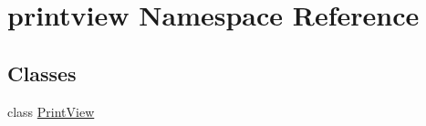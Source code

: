 \hypertarget{namespaceprintview}{}\section{printview Namespace Reference}
\label{namespaceprintview}
\subsection*{Classes}
\begin{DoxyCompactItemize}
\item 
class \hyperlink{classprintview_1_1PrintView}{Print\+View}
\end{DoxyCompactItemize}
